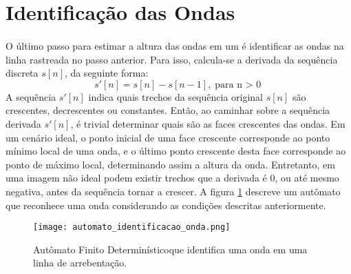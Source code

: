 \section{Identificação das Ondas}
\paragraph{}O último passo para estimar a altura das ondas em um \timestack é identificar as ondas na linha rastreada no passo anterior. Para isso, calcula-se a derivada da sequência discreta $s[n]$, da seguinte forma:
\[
        s'[n] = s[n] - s[n-1], \text{para n $>$ 0}
\] 
\noindent{}A sequência $s'[n]$ indica quais trechos da sequência original $s[n]$ são crescentes, decrescentes ou constantes. Então, ao caminhar sobre a sequência derivada $s'[n]$, é trivial determinar quais são as faces crescentes das ondas. Em um cenário ideal, o ponto inicial de uma face crescente corresponde ao ponto mínimo local de uma onda, e o último ponto crescente desta face corresponde ao ponto de máximo local, determinando assim a altura da onda. Entretanto, em uma imagem não ideal podem existir trechos que a derivada é $0$, ou até mesmo negativa, antes da sequência tornar a crescer. A figura \ref{FigAutomato} descreve um autômato que reconhece uma onda considerando as condições descritas anteriormente.
\begin{figure}[h]
\begin{center}
  \texttt{[image: automato\_identificacao\_onda.png]}
  \caption[\small{Autômato Finito Determinístico que identifica uma onda em uma linha de arrebentação.}]{\label{FigAutomato} \small{Autômato Finito Determinísticoque identifica uma onda em uma linha de arrebentação.}}
\end{center}
\end{figure}
